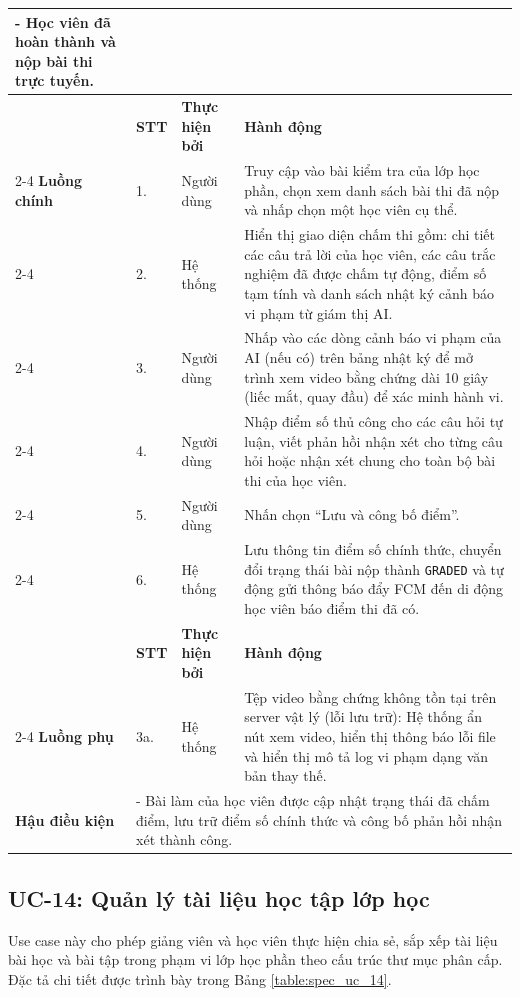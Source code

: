 \documentclass[../DoAn.tex]{subfiles}
\begin{document}
\begin{longtable}{|p{2.8cm}|p{0.8cm}|p{2.2cm}|p{7.5cm}|}
{      - Học viên đã hoàn thành và nộp bài thi trực tuyến.} \\ \hline
     & \textbf{STT} & \textbf{Thực hiện bởi} & \textbf{Hành động} \\ \cline{2-4}
    \textbf{Luồng chính} & 1. & Người dùng & Truy cập vào bài kiểm tra của lớp học phần, chọn xem danh sách bài thi đã nộp và nhấp chọn một học viên cụ thể. \\ \cline{2-4}
     & 2. & Hệ thống & Hiển thị giao diện chấm thi gồm: chi tiết các câu trả lời của học viên, các câu trắc nghiệm đã được chấm tự động, điểm số tạm tính và danh sách nhật ký cảnh báo vi phạm từ giám thị AI. \\ \cline{2-4}
     & 3. & Người dùng & Nhấp vào các dòng cảnh báo vi phạm của AI (nếu có) trên bảng nhật ký để mở trình xem video bằng chứng dài 10 giây (liếc mắt, quay đầu) để xác minh hành vi. \\ \cline{2-4}
     & 4. & Người dùng & Nhập điểm số thủ công cho các câu hỏi tự luận, viết phản hồi nhận xét cho từng câu hỏi hoặc nhận xét chung cho toàn bộ bài thi của học viên. \\ \cline{2-4}
     & 5. & Người dùng & Nhấn chọn ``Lưu và công bố điểm''. \\ \cline{2-4}
     & 6. & Hệ thống & Lưu thông tin điểm số chính thức, chuyển đổi trạng thái bài nộp thành \texttt{GRADED} và tự động gửi thông báo đẩy FCM đến di động học viên báo điểm thi đã có. \\ \hline
     & \textbf{STT} & \textbf{Thực hiện bởi} & \textbf{Hành động} \\ \cline{2-4}
    \textbf{Luồng phụ} & 3a. & Hệ thống & Tệp video bằng chứng không tồn tại trên server vật lý (lỗi lưu trữ): Hệ thống ẩn nút xem video, hiển thị thông báo lỗi file và hiển thị mô tả log vi phạm dạng văn bản thay thế. \\ \hline
    \textbf{Hậu điều kiện} & \multicolumn{3}{p{10.9cm}|}{- Bài làm của học viên được cập nhật trạng thái đã chấm điểm, lưu trữ điểm số chính thức và công bố phản hồi nhận xét thành công.} \\ \hline
\end{longtable}

\subsection{UC-14: Quản lý tài liệu học tập lớp học}

\label{subsection:spec_uc_14}

Use case này cho phép giảng viên và học viên thực hiện chia sẻ, sắp xếp tài liệu bài học và bài tập trong phạm vi lớp học phần theo cấu trúc thư mục phân cấp. Đặc tả chi tiết được trình bày trong Bảng \ref{table:spec_uc_14}.
\end{document}
